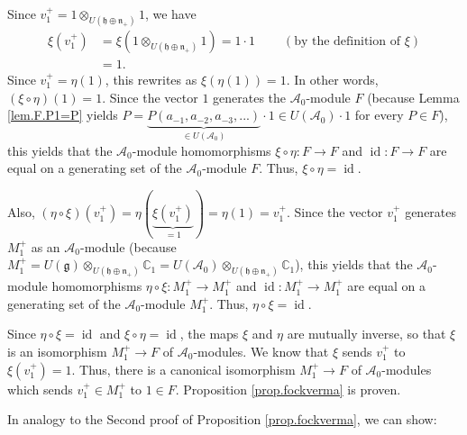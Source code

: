 \documentclass[etingof-lie.tex]{subfiles}
\begin{document}
Since $v_{1}^{+}=1\otimes_{U\left(  \mathfrak{h}\oplus\mathfrak{n}_{+}\right)
}1$, we have%
\begin{align*}
\xi\left(  v_{1}^{+}\right)   &  =\xi\left(  1\otimes_{U\left(  \mathfrak{h}%
\oplus\mathfrak{n}_{+}\right)  }1\right)  =1\cdot1\ \ \ \ \ \ \ \ \ \ \left(
\text{by the definition of }\xi\right) \\
&  =1.
\end{align*}
Since $v_{1}^{+}=\eta\left(  1\right)  $, this rewrites as $\xi\left(
\eta\left(  1\right)  \right)  =1$. In other words, $\left(  \xi\circ
\eta\right)  \left(  1\right)  =1$. Since the vector $1$ generates the
$\mathcal{A}_{0}$-module $F$ (because Lemma \ref{lem.F.P1=P} yields
$P=\underbrace{P\left(  a_{-1},a_{-2},a_{-3},...\right)  }_{\in U\left(
\mathcal{A}_{0}\right)  }\cdot1\in U\left(  \mathcal{A}_{0}\right)  \cdot1$
for every $P\in F$), this yields that the $\mathcal{A}_{0}$-module
homomorphisms $\xi\circ\eta:F\rightarrow F$ and $\operatorname*{id}%
:F\rightarrow F$ are equal on a generating set of the $\mathcal{A}_{0}$-module
$F$. Thus, $\xi\circ\eta=\operatorname*{id}$.

Also, $\left(  \eta\circ\xi\right)  \left(  v_{1}^{+}\right)  =\eta\left(
\underbrace{\xi\left(  v_{1}^{+}\right)  }_{=1}\right)  =\eta\left(  1\right)
=v_{1}^{+}$. Since the vector $v_{1}^{+}$ generates $M_{1}^{+}$ as an
$\mathcal{A}_{0}$-module (because $M_{1}^{+}=U\left(  \mathfrak{g}\right)
\otimes_{U\left(  \mathfrak{h}\oplus\mathfrak{n}_{+}\right)  }\mathbb{C}%
_{1}=U\left(  \mathcal{A}_{0}\right)  \otimes_{U\left(  \mathfrak{h}%
\oplus\mathfrak{n}_{+}\right)  }\mathbb{C}_{1}$), this yields that the
$\mathcal{A}_{0}$-module homomorphisms $\eta\circ\xi:M_{1}^{+}\rightarrow
M_{1}^{+}$ and $\operatorname*{id}:M_{1}^{+}\rightarrow M_{1}^{+}$ are equal
on a generating set of the $\mathcal{A}_{0}$-module $M_{1}^{+}$. Thus,
$\eta\circ\xi=\operatorname*{id}$.

Since $\eta\circ\xi=\operatorname*{id}$ and $\xi\circ\eta=\operatorname*{id}$,
the maps $\xi$ and $\eta$ are mutually inverse, so that $\xi$ is an
isomorphism $M_{1}^{+}\rightarrow F$ of $\mathcal{A}_{0}$-modules. We know
that $\xi$ sends $v_{1}^{+}$ to $\xi\left(  v_{1}^{+}\right)  =1$. Thus, there
is a canonical isomorphism $M_{1}^{+}\rightarrow F$ of $\mathcal{A}_{0}%
$-modules which sends $v_{1}^{+}\in M_{1}^{+}$ to $1\in F$. Proposition
\ref{prop.fockverma} is proven.

In analogy to the Second proof of Proposition \ref{prop.fockverma}, we can show:
\end{document}
